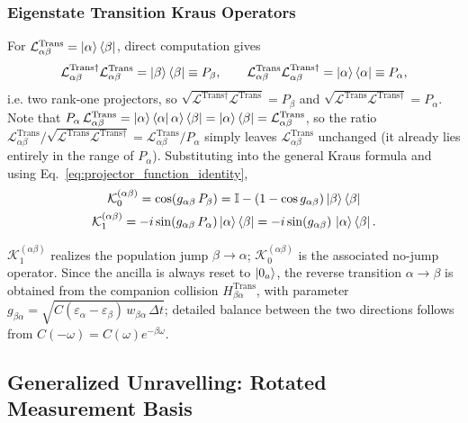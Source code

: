 \documentclass[a4paper,12pt]{article}
\begin{document}
\subsubsection{Eigenstate Transition Kraus Operators}
For $\mathcal{L}_{\alpha\beta}^{\text{Trans}} = \Ket{\alpha}\Bra{\beta}$, direct computation gives
\begin{equation}
	\mathcal{L}_{\alpha\beta}^{\text{Trans}\dagger}\mathcal{L}_{\alpha\beta}^{\text{Trans}} = \Ket{\beta}\Bra{\beta} \equiv P_{\beta}, \qquad
	\mathcal{L}_{\alpha\beta}^{\text{Trans}}\mathcal{L}_{\alpha\beta}^{\text{Trans}\dagger} = \Ket{\alpha}\Bra{\alpha} \equiv P_{\alpha},
\end{equation}
i.e. two rank-one projectors, so $\sqrt{\mathcal{L}^{\text{Trans}\dagger}\mathcal{L}^{\text{Trans}}} = P_{\beta}$ and $\sqrt{\mathcal{L}^{\text{Trans}}\mathcal{L}^{\text{Trans}\dagger}} = P_{\alpha}$. Note that $P_{\alpha}\,\mathcal{L}_{\alpha\beta}^{\text{Trans}} = \Ket{\alpha}\Bra{\alpha}\alpha\rangle\Bra{\beta} = \Ket{\alpha}\Bra{\beta} = \mathcal{L}_{\alpha\beta}^{\text{Trans}}$, so the ratio $\mathcal{L}_{\alpha\beta}^{\text{Trans}}/\sqrt{\mathcal{L}^{\text{Trans}}\mathcal{L}^{\text{Trans}\dagger}} = \mathcal{L}_{\alpha\beta}^{\text{Trans}}/P_\alpha$ simply leaves $\mathcal{L}_{\alpha\beta}^{\text{Trans}}$ unchanged (it already lies entirely in the range of $P_{\alpha}$). Substituting into the general Kraus formula and using Eq.~\eqref{eq:projector_function_identity},
\begin{gather}
	\mathcal{K}_{0}^{(\alpha\beta)} = \cos\!\left(g_{\alpha\beta}\, P_{\beta}\right) = \mathbb{I} - \left(1-\cos g_{\alpha\beta}\right)\Ket{\beta}\Bra{\beta} \\
	\mathcal{K}_{1}^{(\alpha\beta)} = -i \sin\!\left(g_{\alpha\beta}\, P_{\alpha}\right)\Ket{\alpha}\Bra{\beta} = -i \sin(g_{\alpha\beta})\, \Ket{\alpha}\Bra{\beta}.
	\label{eq:kraus_transition_explicit}
\end{gather}

$\mathcal{K}_{1}^{(\alpha\beta)}$ realizes the population jump $\beta\to\alpha$; $\mathcal{K}_{0}^{(\alpha\beta)}$ is the associated no-jump operator. Since the ancilla is always reset to $\Ket{0_{a}}$, the reverse transition $\alpha\to\beta$ is obtained from the companion collision $H_{\beta\alpha}^{\text{Trans}}$, with parameter $g_{\beta\alpha}=\sqrt{C(\varepsilon_\alpha-\varepsilon_\beta)\,w_{\beta\alpha}\,\Delta t}$; detailed balance between the two directions follows from $C(-\omega)=C(\omega)e^{-\beta\omega}$.

\subsection{Generalized Unravelling: Rotated Measurement Basis}
\end{document}
